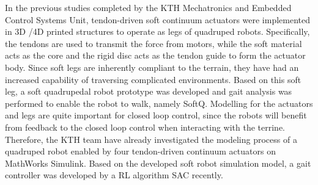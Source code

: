 In the previous studies\cite{thorapallimuralidharanContinuumActuatorBased2020} completed by the KTH Mechatronics and Embedded Control Systems Unit, tendon-driven soft continuum actuators were implemented in \ac{3D} /\ac{4D} printed structures to operate as legs of quadruped robots. Specifically, the tendons are used to transmit the force from motors, while the soft material acts as the core and the rigid disc acts as the tendon guide to form the actuator body. Since soft legs are inherently compliant to the terrain, they have had an increased capability of traversing complicated environments. Based on this soft leg, a soft quadrupedal robot prototype was developed and gait analysis was performed to enable the robot to walk\cite{daneliaStructureGaitOptimizationof2021}, namely SoftQ. Modelling for the actuators and legs are quite important for closed loop control, since the robots will benefit from feedback to the closed loop control when interacting with the terrine. Therefore, the KTH team\cite{muralidharanSoftQuadrupedRobot2021} have already investigated the modeling process of a quadruped robot enabled by four tendon-driven continuum actuators on MathWorks Simulink\textsuperscript{\textregistered}. Based on the developed soft robot simulation model, a gait controller was developed by a \ac{RL} algorithm \ac{SAC} recently\cite{jiSynthesizingOptimalGait2022}.

